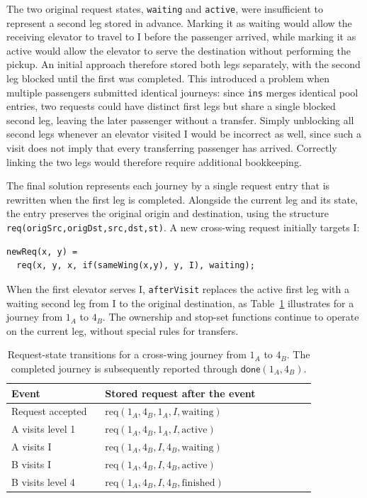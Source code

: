 The two original request states, \texttt{waiting} and \texttt{active}, were insufficient to represent a second leg stored in advance. Marking it as waiting would allow the receiving elevator to travel to I before the passenger arrived, while marking it as active would allow the elevator to serve the destination without performing the pickup. An initial approach therefore stored both legs separately, with the second leg blocked until the first was completed. This introduced a problem when multiple passengers submitted identical journeys: since \texttt{ins} merges identical pool entries, two requests could have distinct first legs but share a single blocked second leg, leaving the later passenger without a transfer. Simply unblocking all second legs whenever an elevator visited I would be incorrect as well, since such a visit does not imply that every transferring passenger has arrived. Correctly linking the two legs would therefore require additional bookkeeping.

The final solution represents each journey by a single request entry that is rewritten when the first leg is completed. Alongside the current leg and its state, the entry preserves the original origin and destination, using the structure \texttt{req(origSrc,origDst,src,dst,st)}. A new cross-wing request initially targets I:

\begin{lstlisting}
newReq(x, y) =
  req(x, y, x, if(sameWing(x,y), y, I), waiting);
\end{lstlisting}

When the first elevator serves I, \texttt{afterVisit} replaces the active first leg with a waiting second leg from I to the original destination, as Table~\ref{tab:cross-wing-example} illustrates for a journey from \(1_A\) to \(4_B\). The ownership and stop-set functions continue to operate on the current leg, without special rules for transfers.

\begin{table}[htbp]
\centering
\small
\renewcommand{\arraystretch}{1.3}
\begin{tabular}{@{}p{0.29\linewidth}p{0.63\linewidth}@{}}
\toprule
\textbf{Event} & \textbf{Stored request after the event}\\
\midrule
Request accepted &
\(\mathrm{req}(1_A,4_B,1_A,I,\mathrm{waiting})\)\\
A visits level 1 &
\(\mathrm{req}(1_A,4_B,1_A,I,\mathrm{active})\)\\
A visits I &
\(\mathrm{req}(1_A,4_B,I,4_B,\mathrm{waiting})\)\\
B visits I &
\(\mathrm{req}(1_A,4_B,I,4_B,\mathrm{active})\)\\
B visits level 4 &
\(\mathrm{req}(1_A,4_B,I,4_B,\mathrm{finished})\)\\
\bottomrule
\end{tabular}
\caption{Request-state transitions for a cross-wing journey from \(1_A\) to \(4_B\). The completed journey is subsequently reported through \(\mathsf{done}(1_A,4_B)\).}
\label{tab:cross-wing-example}
\end{table}

